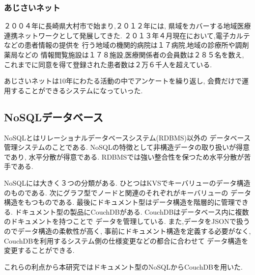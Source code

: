   \subsubsection{あじさいネット}
    ２００４年に長崎県大村市で始まり,２０１２年には,
    県域をカバーする地域医療連携ネットワークとして発展してきた.
    ２０１３年４月現在において,電子カルテなどの患者情報の提供を
    行う地域の機関的病院は１７病院,地域の診療所や調剤薬局などの
    情報閲覧施設は１７８施設,医療関係者の会員数は２８５名を数え,
    これまでに同意を得て登録された患者数は２万６千人を超えている.

    あじさいネットは10年にわたる活動の中でアンケートを繰り返し,
    会費だけで運用することができるシステムになっていった.
    \cite{bibi3}

\subsection{NoSQLデータベース}
NoSQLとはリレーショナルデータベースシステム(RDBMS)以外の
データベース管理システムのことである.
NoSQLの特徴として非構造データの取り扱いが得意であり,
水平分散が得意である.
RDBMSでは強い整合性を保つため水平分散が苦手である.

NoSQLには大きく３つの分類がある.
ひとつはKVSでキーバリューのデータ構造のものである.
次にグラフ型でノードと関連のそれぞれがキーバリューの
データ構造をもつものである.
最後にドキュメント型はデータ構造を階層的に管理できる.
ドキュメント型の製品にCouchDBがある.
CouchDBはデータベース内に複数のドキュメントを持つことで
データを管理している.
また,データをJSONで扱うのでデータ構造の柔軟性が高く,
事前にドキュメント構造を定義する必要がなく,
CouchDBを利用するシステム側の仕様変更などの都合に合わせて
データ構造を変更することができる.
\cite{bibi121}

これらの利点から本研究ではドキュメント型のNoSQLからCouchDBを用いた.
